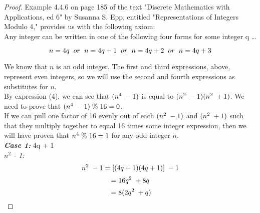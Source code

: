 \documentclass[12pt]{article}
\begin{document}
\begin{proof}
Example 4.4.6 on page 185 of the text "Discrete Mathematics with Applications, ed 6" by Susanna S. Epp, entitled "Representations of Integers Modulo 4," provides us with the following axiom: \\

Any integer can be written in one of the following four forms for some integer q \ldots

\begin{equation}
n = 4q \hspace{.2cm} or \hspace{.2cm} n = 4q + 1 \hspace{.2cm} or \hspace{.2cm} n = 4q + 2 \hspace{.2cm} or \hspace{.2cm} n = 4q + 3
\end{equation}
\bigskip

We know that $n$ is an odd integer. The first and third expressions, above, represent even integers, so we will use the second and fourth expressions as substitutes for $n$. \\

By expression (4), we can see that $(n^4 \hspace{.1cm} - 1)$ is equal to $(n^2 \hspace{.1cm} - 1)(n^2 \hspace{.1cm} + 1)$. We need to prove that $(n^4 \hspace{.1cm} - 1 )\hspace{.1cm} \% \hspace{.1cm} 16 = 0$. \\

If we can pull one factor of 16 evenly out of each $(n^2 \hspace{.1cm} - 1)$ and $(n^2 \hspace{.1cm} + 1)$ such that they multiply together to equal 16 times some integer expression, then we will have proven that $n^4 \hspace{.1cm} \%  \hspace{.1cm} 16 = 1$ for any odd integer $n$. \\

\textbf{\textit{Case 1:}} 4q + 1 \\

\textit{$n^2$ - 1:}
\begin{equation}
n^2  \hspace{.1cm} - 1 = [(4q + 1)(4q + 1)]  \hspace{.1cm} - 1 
\end{equation}
\begin{equation}
= 16q^2  \hspace{.1cm} + 8q \\
\end{equation}
\begin{equation}
\hspace{.1cm} = 8(2q^2  \hspace{.1cm} + q)
\end{equation}


\end{proof}
\end{document}
